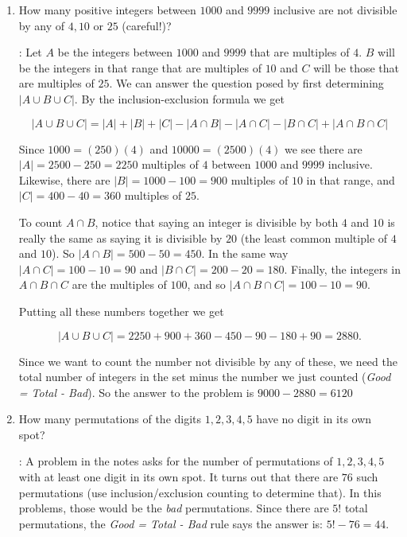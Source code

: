 \documentclass[11pt]{amsart}
\begin{document}
\begin{enumerate}

\item How many positive integers between $1000$ and $9999$ inclusive are not divisible by
any of $4,10$ or $25$ (careful!)?

: Let $A$ be the integers between $1000$ and $9999$ that are multiples of $4$.
$B$ will be the integers in that range that are multiples of $10$ and $C$ will be those that are
multiples of $25$. We can answer the question posed by first determining $|A\cup B\cup C|$. By
the inclusion-exclusion formula we get

\[
|A\cup B\cup C| = |A| + |B| + |C| - |A\cap B| - |A\cap C| - |B\cap C| + |A\cap B\cap C|
\]

Since $1000 = (250)(4)$ and $10000= (2500)(4)$ we see there are $|A| = 2500-250 = 2250$ multiples of
$4$ between $1000$ and $9999$ inclusive. Likewise, there are $|B| = 1000-100 = 900$ multiples of $10$
in that range, and $|C| = 400-40 = 360$ multiples of $25$.

To count $A\cap B$, notice that saying an integer is divisible by both $4$ and $10$ is really the same
as saying it is divisible by $20$ (the least common multiple of $4$ and $10$). So
$|A\cap B| = 500-50=450$. In the same way $|A\cap C| = 100-10 = 90$ and $|B\cap C| = 200-20 = 180$.
Finally, the integers in $A\cap B\cap C$ are  the multiples of $100$, and so $|A\cap B\cap C| = 100-10=90$.

Putting all these numbers together we get

\[
|A\cup B\cup C| = 2250+900+360 - 450-90-180 + 90 = 2880.
\]

Since we want to count the number not divisible by any of these, we need the total number
of integers in the set minus the number we just counted ({\it Good = Total - Bad}).
So the answer to the problem is $9000-2880 = 6120$

\medskip

\item How many permutations of the digits $1,2,3,4,5$ have no digit in its own spot?

: A problem in the notes asks for the number of permutations  of $1,2,3,4,5$
with at least one digit in its own spot. It turns out that there are $76$ such permutations (use inclusion/exclusion counting to determine that). In this problems, those would be the {\it bad} permutations.
Since there are $5!$ total permutations, the {\it Good = Total - Bad} rule says the answer is: $5! - 76 = 44$.


\end{enumerate}
\end{document}
